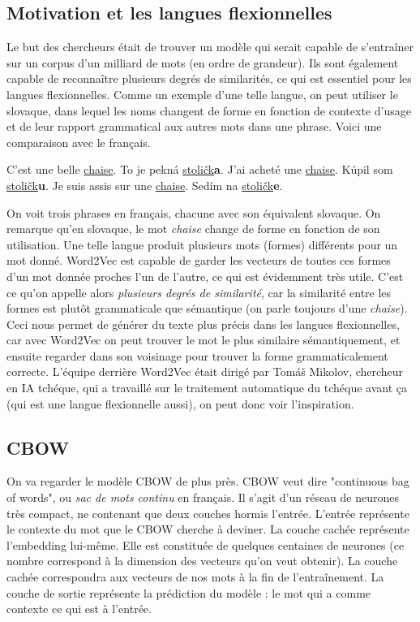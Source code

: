 \documentclass[11pt, a4paper]{report}
\begin{document}
\subsection{Motivation et les langues flexionnelles}
\cite{word2vec-original} Le but des chercheurs était de trouver un modèle qui serait capable de s'entraîner sur un corpus 
d'un milliard de mots (en ordre de grandeur). Ils sont également capable de reconnaître 
plusieurs degrés de similarités, ce qui est essentiel pour les langues flexionnelles. 
Comme un exemple d'une telle langue, on peut utiliser le slovaque, dans lequel les noms 
changent de forme en fonction de contexte d'usage et de leur rapport grammatical aux autres 
mots dans une phrase. Voici une comparaison avec le français.

\begin{center}
  C'est une belle \underline{chaise}. To je pekná \underline{stoličk}\textbf{a}. \newline
  J'ai acheté une \underline{chaise}. Kúpil som \underline{stoličk}\textbf{u}. \newline
  Je suis assis sur une \underline{chaise}. Sedím na \underline{stoličk}\textbf{e}. \newline
\end{center}

On voit trois phrases en français, chacune avec son équivalent slovaque. On remarque qu'en 
slovaque, le mot \textit{chaise} change de forme en fonction de son utilisation. Une telle 
langue produit plusieurs mots (formes) différents pour un mot donné. Word2Vec est capable 
de garder les vecteurs de toutes ces formes d'un mot donnée proches l'un de l'autre, 
ce qui est évidemment très utile. C'est ce qu'on appelle alors \textit{plusieurs degrés 
de similarité}, car la similarité entre les formes est plutôt grammaticale que 
sémantique (on parle toujours d'une \textit{chaise}). Ceci nous permet de générer du texte 
plus précis dans les langues flexionnelles, car avec Word2Vec on peut trouver le mot le plus 
similaire sémantiquement, et ensuite regarder dans son voisinage pour trouver la forme 
grammaticalement correcte. L'équipe derrière Word2Vec était dirigé par Tomáš Mikolov, 
chercheur en IA tchéque, qui a travaillé sur le traitement automatique du tchéque avant ça
(qui est une langue flexionnelle aussi), on peut donc voir l'inspiration. 

\subsection{CBOW}
On va regarder le modèle CBOW de plus près. CBOW veut dire "continuous bag of words", ou 
\textit{sac de mots continu} en français. Il s'agit d'un réseau de neurones très compact, 
ne contenant que deux couches hormis l'entrée. L'entrée représente le contexte du mot que 
le CBOW cherche à deviner. La couche cachée représente l'embedding lui-même. Elle est constituée
de quelques centaines de neurones (ce nombre correspond à la dimension des vecteurs qu'on veut 
obtenir). La couche 
cachée correspondra aux vecteurs de nos mots à la fin de l'entraînement. La couche de sortie 
représente la prédiction du modèle : le mot qui a comme contexte ce qui est à l'entrée. 
\end{document}
